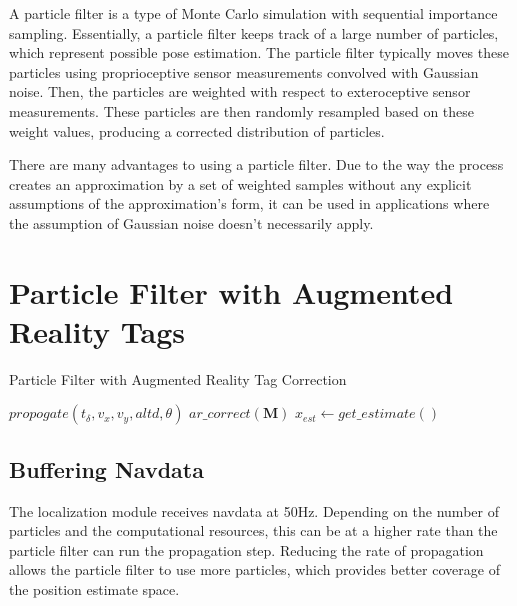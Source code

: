 A particle filter is a type of Monte Carlo simulation with sequential importance sampling.\cite{Alkhatib} Essentially, a particle filter keeps track of a large number of particles, which represent possible pose estimation. The particle filter typically moves these particles using proprioceptive sensor measurements convolved with Gaussian noise.\cite{Fox} Then, the particles are weighted with respect to exteroceptive sensor measurements. These particles are then randomly resampled based on these weight values, producing a corrected distribution of particles.

There are many advantages to using a particle filter. Due to the way the process creates an approximation by a set of weighted samples without any explicit assumptions of the approximation's form, it can be used in applications where the assumption of Gaussian noise doesn't necessarily apply.\cite{Alkhatib} 

\section{Particle Filter with Augmented Reality Tags}



	\begin{algorithm}
		\centering
		\caption{Particle Filter with Augmented Reality Tag Correction} 
		\begin{algorithmic}[1]
					\State $propogate(t_{\delta}, v_x, v_y, altd, \theta)$
				\EndIf
					\State $ar\_correct(\textbf{M})$ 
				\EndIf
				\State $x_{est} \gets get\_estimate()$
			\EndFor
		\end{algorithmic}
	\end{algorithm}

\subsection{Buffering Navdata}

The localization module receives navdata at 50Hz. Depending on the number of particles and the computational resources, this can be at a higher rate than the particle filter can run the propagation step. Reducing the rate of propagation allows the particle filter to use more particles, which provides better coverage of the position estimate space.

